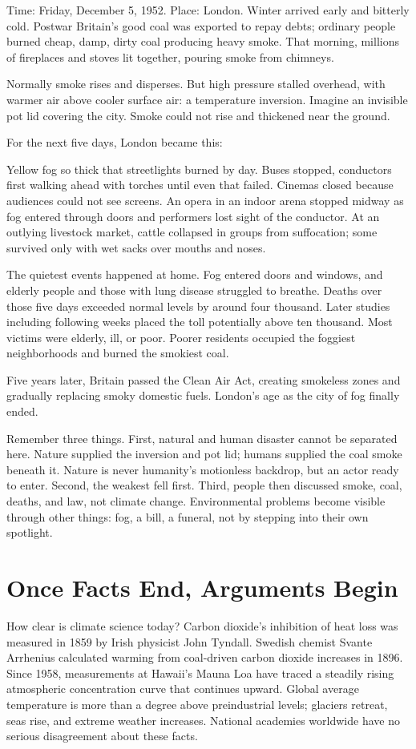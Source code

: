 Time: Friday, December 5, 1952. Place: London. Winter arrived early and bitterly cold. Postwar Britain's good coal was exported to repay debts; ordinary people burned cheap, damp, dirty coal producing heavy smoke. That morning, millions of fireplaces and stoves lit together, pouring smoke from chimneys.

Normally smoke rises and disperses. But high pressure stalled overhead, with warmer air above cooler surface air: a temperature inversion. Imagine an invisible pot lid covering the city. Smoke could not rise and thickened near the ground.

For the next five days, London became this:

Yellow fog so thick that streetlights burned by day. Buses stopped, conductors first walking ahead with torches until even that failed. Cinemas closed because audiences could not see screens. An opera in an indoor arena stopped midway as fog entered through doors and performers lost sight of the conductor. At an outlying livestock market, cattle collapsed in groups from suffocation; some survived only with wet sacks over mouths and noses.

The quietest events happened at home. Fog entered doors and windows, and elderly people and those with lung disease struggled to breathe. Deaths over those five days exceeded normal levels by around four thousand. Later studies including following weeks placed the toll potentially above ten thousand. Most victims were elderly, ill, or poor. Poorer residents occupied the foggiest neighborhoods and burned the smokiest coal.

Five years later, Britain passed the Clean Air Act, creating smokeless zones and gradually replacing smoky domestic fuels. London's age as the city of fog finally ended.

Remember three things. First, natural and human disaster cannot be separated here. Nature supplied the inversion and pot lid; humans supplied the coal smoke beneath it. Nature is never humanity's motionless backdrop, but an actor ready to enter. Second, the weakest fell first. Third, people then discussed smoke, coal, deaths, and law, not climate change. Environmental problems become visible through other things: fog, a bill, a funeral, not by stepping into their own spotlight.

\section{Once Facts End, Arguments Begin}
How clear is climate science today? Carbon dioxide's inhibition of heat loss was measured in 1859 by Irish physicist John Tyndall. Swedish chemist Svante Arrhenius calculated warming from coal-driven carbon dioxide increases in 1896. Since 1958, measurements at Hawaii's Mauna Loa have traced a steadily rising atmospheric concentration curve that continues upward. Global average temperature is more than a degree above preindustrial levels; glaciers retreat, seas rise, and extreme weather increases. National academies worldwide have no serious disagreement about these facts.

